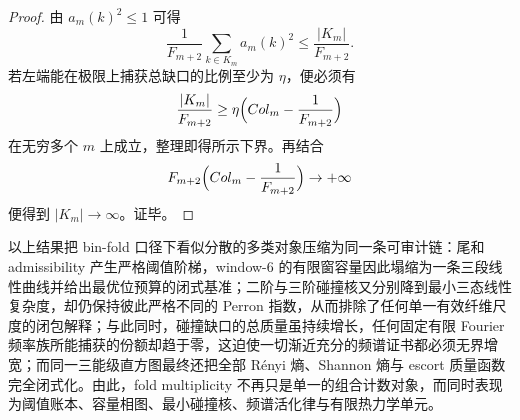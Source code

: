 \begin{proof}
由 \(a_m(k)^2\le 1\) 可得
\[
\frac1{F_{m+2}}\sum_{k\in K_m}a_m(k)^2
\le \frac{|K_m|}{F_{m+2}}.
\]
若左端能在极限上捕获总缺口的比例至少为 \(\eta\)，便必须有
\[
\frac{|K_m|}{F_{m+2}}
\ge
\eta\Bigl(Col_m-\frac1{F_{m+2}}\Bigr)
\]
在无穷多个 \(m\) 上成立，整理即得所示下界。再结合
\[
F_{m+2}\Bigl(Col_m-\frac1{F_{m+2}}\Bigr)\to+\infty
\]
便得到 \(|K_m|\to\infty\)。证毕。
\end{proof}

\noindent
以上结果把 bin-fold 口径下看似分散的多类对象压缩为同一条可审计链：尾和 admissibility 产生严格阈值阶梯，window-\(6\) 的有限窗容量因此塌缩为一条三段线性曲线并给出最优位预算的闭式基准；二阶与三阶碰撞核又分别降到最小三态线性复杂度，却仍保持彼此严格不同的 Perron 指数，从而排除了任何单一有效纤维尺度的闭包解释；与此同时，碰撞缺口的总质量虽持续增长，任何固定有限 Fourier 频率族所能捕获的份额却趋于零，这迫使一切渐近充分的频谱证书都必须无界增宽；而同一三能级直方图最终还把全部 R\'enyi 熵、Shannon 熵与 escort 质量函数完全闭式化。由此，fold multiplicity 不再只是单一的组合计数对象，而同时表现为阈值账本、容量相图、最小碰撞核、频谱活化律与有限热力学单元。

\endinput

